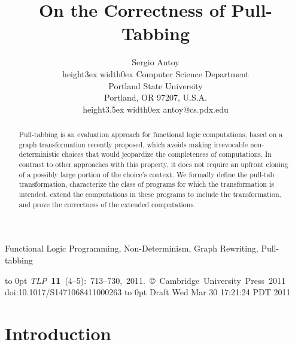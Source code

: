 \documentclass{mytlp}
\renewcommand{\tt}{\usefont{OT1}{cmtt}{m}{n}\selectfont}
\begin{document}
\setcounter{page}{713}



\title{On the Correctness of Pull-Tabbing}



\author[S. Antoy]
{
Sergio Antoy \\
  \vrule height3ex width0ex Computer Science Department \\
  Portland State University \\
  Portland, OR 97207, U.S.A. \\
  \vrule height3.5ex width0ex {\tt antoy@cs.pdx.edu}
}

\maketitle
\begin{abstract}
  Pull-tabbing is an evaluation approach for functional
  logic computations, based on a graph transformation recently proposed,
  which avoids making irrevocable non-deterministic
  choices that would jeopardize the completeness of computations.
  In contrast to other approaches with this property, it does not
  require an upfront cloning of a possibly large portion of the
  choice's context.
We formally define the pull-tab transformation,
  characterize the class of programs for which the transformation
  is intended, extend the computations in these programs
  to include the transformation, and prove the correctness
  of the extended computations.
\end{abstract}
\begin{keywords}
  Functional Logic Programming, Non-Determinism, Graph Rewriting, Pull-tabbing
\end{keywords}



{{\fontsize{6}{9pt}\sffamily
 \vbox to 0pt{
 \kern-4.5in
 \hbox {\emph{TLP} {\bf 11} (4--5): 713--730, 2011.
    \copyright\ Cambridge University Press 2011}
 \hbox {doi:10.1017/S1471068411000263}
 \hbox to 0pt {Draft Wed Mar 30 17:21:24 PDT 2011 \hss}
}}}

\section{Introduction}
\end{document}
